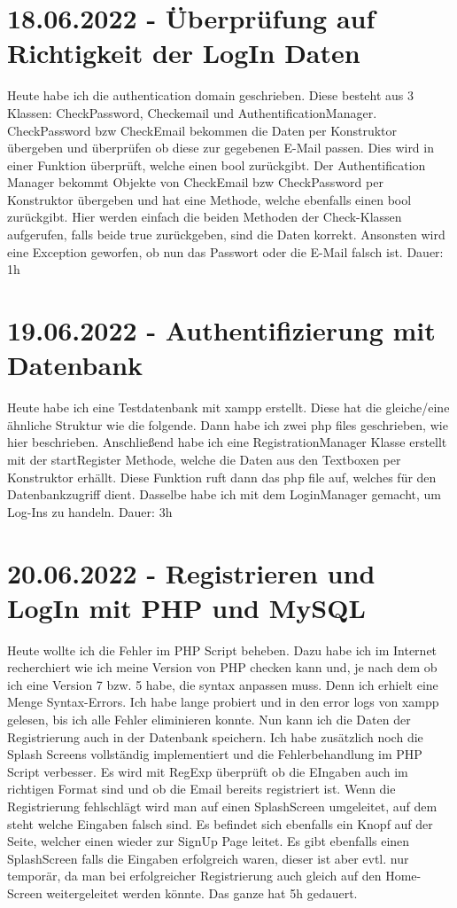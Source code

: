 \documentclass[letterpaper,10pt]{article}
\begin{document}
\section{18.06.2022 - Überprüfung auf Richtigkeit der LogIn Daten}
Heute habe ich die authentication domain geschrieben. Diese besteht aus 3 Klassen: CheckPassword, Checkemail und AuthentificationManager. CheckPassword bzw CheckEmail bekommen die Daten per Konstruktor übergeben und überprüfen ob diese zur gegebenen E-Mail passen. Dies wird in einer Funktion überprüft, welche einen bool zurückgibt. Der Authentification Manager bekommt Objekte von CheckEmail bzw CheckPassword per Konstruktor übergeben und hat eine Methode, welche ebenfalls einen bool zurückgibt. Hier werden einfach die beiden Methoden der Check-Klassen aufgerufen, falls beide true zurückgeben, sind die Daten korrekt. Ansonsten wird eine Exception geworfen, ob nun das Passwort oder die E-Mail falsch ist. Dauer: 1h
\section{19.06.2022 - Authentifizierung mit Datenbank}
Heute habe ich eine Testdatenbank mit xampp erstellt. Diese hat die gleiche/eine ähnliche Struktur wie die folgende. Dann habe ich zwei php files geschrieben, wie hier beschrieben\cite{mysql-php}. Anschließend habe ich eine RegistrationManager Klasse erstellt mit der startRegister Methode, welche die Daten aus den Textboxen per Konstruktor erhällt. Diese Funktion ruft dann das php file auf, welches für den Datenbankzugriff dient. Dasselbe habe ich mit dem LoginManager gemacht, um Log-Ins zu handeln. Dauer: 3h 
\section{20.06.2022 - Registrieren und LogIn mit PHP und MySQL}
Heute wollte ich die Fehler im PHP Script beheben. Dazu habe ich im Internet recherchiert wie ich meine Version von PHP checken kann und, je nach dem ob ich eine Version 7 bzw. 5 habe, die syntax anpassen muss. Denn ich erhielt eine Menge Syntax-Errors. Ich habe lange probiert und in den error logs von xampp gelesen, bis ich alle Fehler eliminieren konnte. Nun kann ich die Daten der Registrierung auch in der Datenbank speichern. Ich habe zusätzlich noch die Splash Screens vollständig implementiert und die Fehlerbehandlung im PHP Script verbesser. Es wird mit RegExp überprüft ob die EIngaben auch im richtigen Format sind und ob die Email bereits registriert ist. Wenn die Registrierung fehlschlägt wird man auf einen SplashScreen umgeleitet, auf dem steht welche Eingaben falsch sind. Es befindet sich ebenfalls ein Knopf auf der Seite, welcher einen wieder zur SignUp Page leitet. Es gibt ebenfalls einen SplashScreen falls die Eingaben erfolgreich waren, dieser ist aber evtl. nur temporär, da man bei erfolgreicher Registrierung auch gleich auf den Home-Screen weitergeleitet werden könnte. Das ganze hat 5h gedauert.  
\end{document}
